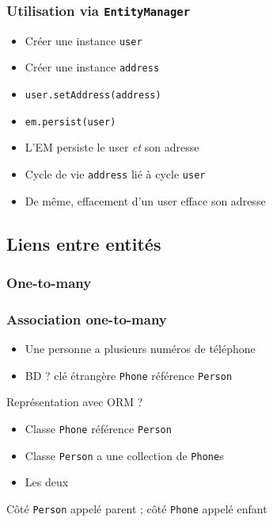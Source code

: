 \documentclass[english, french]{beamer}
\begin{document}
\begin{frame}
	\frametitle{Utilisation via \texttt{EntityManager}}
	\begin{itemize}
		\item Créer une instance \texttt{user}
		\item Créer une instance \texttt{address}
		\item \texttt{user.setAddress(address)}
		\item \texttt{em.persist(user)}
		\item L’EM persiste le user \emph{et} son adresse
		\item Cycle de vie \texttt{address} lié à cycle \texttt{user}
		\item De même, effacement d’un user efface son adresse
	\end{itemize}
\end{frame}

\subsection{Liens entre entités}
\subsubsection{One-to-many}
\begin{frame}
	\frametitle{Association one-to-many}
	\begin{itemize}
		\item Une personne a plusieurs numéros de téléphone
		\item BD ? \pause clé étrangère \texttt{Phone} référence \texttt{Person}
	\end{itemize}
	\pause
	
	\vspace{1em}
	Représentation avec ORM ? \pause
	\begin{itemize}
		\item Classe \texttt{Phone} référence \texttt{Person}
		\item Classe \texttt{Person} a une collection de \texttt{Phone}s
		\item Les deux
	\end{itemize}
	Côté \texttt{Person} appelé parent ; côté \texttt{Phone} appelé enfant
\end{frame}
\end{document}
